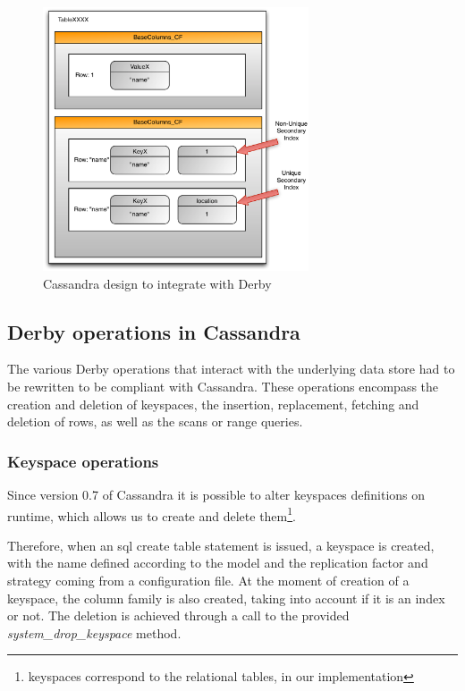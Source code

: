 \begin{figure}[htb]
  \begin{center}
    \leavevmode
    \includegraphics[width=0.7\textwidth]{images/mymodel}
  \end{center}
  \caption{Cassandra design to integrate with Derby}
  \label{fig:mymodel}
\end{figure}

\subsection{Derby operations in Cassandra}
\label{sec:cassandraops}

The various Derby operations that interact with the underlying data store had to be rewritten to be compliant with Cassandra. These operations encompass the creation and deletion of keyspaces, the insertion, replacement, fetching and deletion of rows, as well as the scans or range queries.

\subsubsection{Keyspace operations}
Since version 0.7 of Cassandra it is possible to alter keyspaces definitions on runtime, which allows us to create and delete them\footnote{keyspaces correspond to the relational tables, in our implementation}.

Therefore, when an \ac{sql} create table statement is issued, a keyspace is created, with the name defined according to the model and the replication factor and strategy coming from a configuration file. At the moment of creation of a keyspace, the column family is also created, taking into account if it is an index or not. The deletion is achieved through a call to the provided \emph{system\_drop\_keyspace} method.

